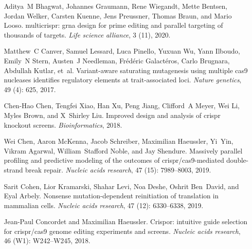\documentclass[pdftex,english,10pt]{article}
\begin{document}
{\begin{thebibliography}{105}
Aditya~M Bhagwat, Johannes Graumann, Rene Wiegandt, Mette Bentsen, Jordan
  Welker, Carsten Kuenne, Jens Preussner, Thomas Braun, and Mario Looso.
\newblock multicrispr: grna design for prime editing and parallel targeting of
  thousands of targets.
\newblock \emph{Life science alliance}, 3 (11), 2020.

Matthew~C Canver, Samuel Lessard, Luca Pinello, Yuxuan Wu, Yann Ilboudo,
  Emily~N Stern, Austen~J Needleman, Fr{\'e}d{\'e}ric Galact{\'e}ros, Carlo
  Brugnara, Abdullah Kutlar, et~al.
\newblock Variant-aware saturating mutagenesis using multiple cas9 nucleases
  identifies regulatory elements at trait-associated loci.
\newblock \emph{Nature genetics}, 49 (4): 625, 2017.

Chen-Hao Chen, Tengfei Xiao, Han Xu, Peng Jiang, Clifford~A Meyer, Wei Li,
  Myles Brown, and X~Shirley Liu.
\newblock Improved design and analysis of crispr knockout screens.
\newblock \emph{Bioinformatics}, 2018.

Wei Chen, Aaron McKenna, Jacob Schreiber, Maximilian Haeussler, Yi~Yin, Vikram
  Agarwal, William~Stafford Noble, and Jay Shendure.
\newblock Massively parallel profiling and predictive modeling of the outcomes
  of crispr/cas9-mediated double-strand break repair.
\newblock \emph{Nucleic acids research}, 47 (15): 7989--8003,
  2019.

Sarit Cohen, Lior Kramarski, Shahar Levi, Noa Deshe, Oshrit Ben~David, and Eyal
  Arbely.
\newblock Nonsense mutation-dependent reinitiation of translation in mammalian
  cells.
\newblock \emph{Nucleic acids research}, 47 (12): 6330--6338,
  2019.

Jean-Paul Concordet and Maximilian Haeussler.
\newblock Crispor: intuitive guide selection for crispr/cas9 genome editing
  experiments and screens.
\newblock \emph{Nucleic acids research}, 46 (W1): W242--W245,
  2018.


\end{thebibliography}}
\end{document}

